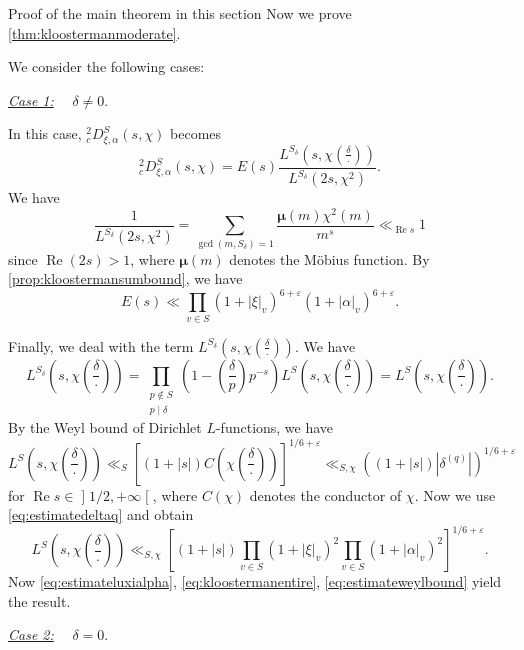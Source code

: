 \documentclass[10pt,oneside,reqno]{amsart}
\makeatletter
\newcommand\lopen{\mathopen{]}}
\newcommand\ropen{\mathclose{[}}
\renewcommand\Re{\mathop{\mathrm{Re}}}
\newcommand\legendresymbol[2]{\genfrac{(}{)}{}{}{#1}{#2}}
\def\subsection{\@startsection{subsection}{2}%
  \z@{3pt\@plus0pt}{-.5em}%
  {\normalfont\bfseries}}
\theoremstyle{THEOREM}
\theoremstyle{DEFINITION}
\theoremstyle{EXERCISE}
\numberwithin{equation}{section}
\renewenvironment{proof}[1][\proofname]{\par
  \vspace{-6pt}
  \pushQED{\qed}
  \normalfont \topsep6\p@\@plus6\p@\relax
  \trivlist
  \item[\hskip\labelsep\rmfamily\bfseries
    #1\@addpunct{:}]\ignorespaces
}{
  \popQED\endtrivlist\@endpefalse
  \vspace{-6pt}
}
\makeatother
\begin{document}
\subsection{Proof of the main theorem in this section} Now we prove \autoref{thm:kloostermanmoderate}.
\begin{proof}[Proof of \autoref{thm:kloostermanmoderate}]
We consider the following cases:

\underline{\emph{Case 1:}} \ \ $\delta\neq 0$.

In this case, $_c^2D_{\xi,\alpha}^S(s,\chi)$ becomes
\[
_c^2D_{\xi,\alpha}^S(s,\chi)=E(s) \frac{L^{S_\delta}(s,\chi \legendresymbol{\delta}{\cdot})}{L^{S_\delta}(2s,\chi^2)}.
\]
We have 
\begin{equation}\label{eq:estimateluxialpha}
\frac{1}{L^{S_\delta}(2s,\chi^2)}=\sum_{\gcd(m,S_\delta)=1}\frac{\bm\mu(m)\chi^2(m)}{m^s}\ll_{\Re s} 1
\end{equation}
since $\Re(2s)>1$, where $\bm\mu(m)$ denotes the M\"obius function. By \autoref{prop:kloostermansumbound}, we have
\begin{equation}\label{eq:kloostermanentire}
E(s)\ll \prod_{v\in S}(1+|\xi|_v)^{6+\varepsilon}(1+|\alpha|_v)^{6+\varepsilon}.
\end{equation}

Finally, we deal with the term $L^{S_\delta}(s,\chi \legendresymbol{\delta}{\cdot})$. We have
\[
L^{S_\delta}\left(s,\chi \legendresymbol{\delta}{\cdot}\right)=\prod_{\substack{p\notin S\\ p\mid\delta}}\left(1-\legendresymbol{\delta}{p}p^{-s}\right)L^{S}\left(s,\chi \legendresymbol{\delta}{\cdot}\right)=L^{S}\left(s,\chi \legendresymbol{\delta}{\cdot}\right).
\]
By the Weyl bound of Dirichlet $L$-functions, we have
\[
L^S\left(s,\chi \legendresymbol{\delta}{\cdot}\right)\ll_{S}\left[(1+|s|)C\!\left(\chi\legendresymbol{\delta}{\cdot}\right) \right]^{1/6+\varepsilon}\ll_{S,\chi} ((1+|s|)|\delta^{(q)}|)^{1/6+\varepsilon}
\]
for $\Re s\in \lopen 1/2,+\infty\ropen$, where $C(\chi)$ denotes the conductor of $\chi$. Now we use \eqref{eq:estimatedeltaq} and obtain
\begin{equation}\label{eq:estimateweylbound}
L^S\left(s,\chi \legendresymbol{\delta}{\cdot}\right)\ll_{S,\chi}  \left[(1+|s|)\prod_{v\in S}(1+|\xi|_v)^{2}\prod_{v\in S}(1+|\alpha|_v)^2\right]^{1/6+\varepsilon}.
\end{equation}
Now \eqref{eq:estimateluxialpha}, \eqref{eq:kloostermanentire}, \eqref{eq:estimateweylbound} yield the result.

\underline{\emph{Case 2:}} \ \ $\delta= 0$. 


\end{proof}
\end{document}
